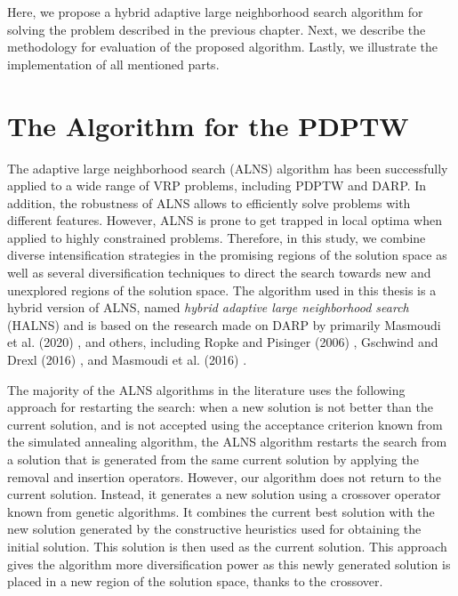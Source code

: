 Here, we propose a hybrid adaptive large neighborhood search algorithm for solving the problem described in the previous chapter. Next, we describe the methodology for evaluation of the proposed algorithm. Lastly, we illustrate the implementation of all mentioned parts.

\section{The Algorithm for the PDPTW} \label{sec:halns}

    The adaptive large neighborhood search (ALNS) algorithm has been successfully applied to a wide range of VRP problems, including PDPTW and DARP. In addition, the robustness of ALNS allows to efficiently solve problems with different features. However, ALNS is prone to get trapped in local optima when applied to highly constrained problems. Therefore, in this study, we combine diverse intensification strategies in the promising regions of the solution space as well as several diversification techniques to direct the search towards new and unexplored regions of the solution space. The algorithm used in this thesis is a hybrid version of ALNS, named \emph{hybrid adaptive large neighborhood search} (HALNS) and is based on the research made on DARP by primarily Masmoudi et al. (2020) \cite{Masmoudi2020}, and others, including Ropke and Pisinger (2006) \cite{Ropke2006}, Gschwind and Drexl (2016) \cite{Gschwind2016}, and Masmoudi et al. (2016) \cite{Masmoudi2016}.
    
    The majority of the ALNS algorithms in the literature uses the following approach for restarting the search: when a new solution is not better than the current solution, and is not accepted using the acceptance criterion known from the simulated annealing algorithm, the ALNS algorithm restarts the search from a solution that is generated from the same current solution by applying the removal and insertion operators. However, our algorithm does not return to the current solution. Instead, it generates a new solution using a crossover operator known from genetic algorithms. It combines the current best solution with the new solution generated by the constructive heuristics used for obtaining the initial solution. This solution is then used as the current solution. This approach gives the algorithm more diversification power as this newly generated solution is placed in a new region of the solution space, thanks to the crossover.
    
